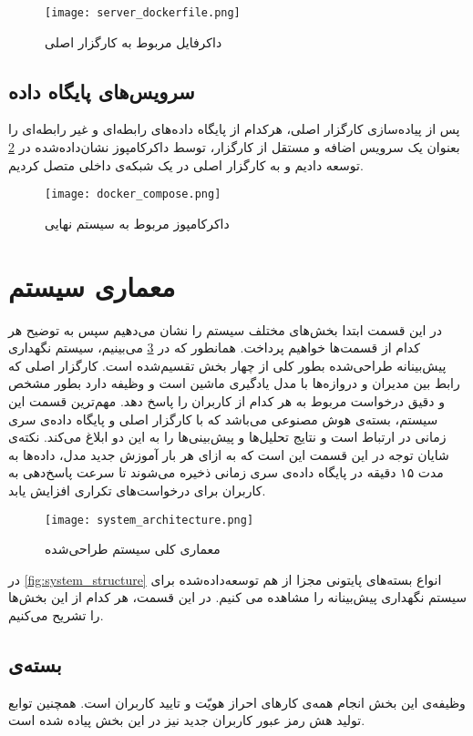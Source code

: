 \begin{figure}[!h]
\centerline{\texttt{[image: server\_dockerfile.png]}}
\caption{داکرفایل مربوط به کارگزار اصلی}
\label{fig:server_dockerfile}
\end{figure}

\subsection{سرویس‌های پایگاه داده}
پس از پیاده‌سازی کارگزار اصلی، هرکدام از پایگاه‌ داده‌های رابطه‌ای و غیر رابطه‌ای را بعنوان یک سرویس اضافه و مستقل از کارگزار، توسط داکرکامپوز نشان‌داده‌‌شده در \cref{fig:docker_compose} توسعه دادیم و به کارگزار اصلی در یک شبکه‌ی داخلی متصل کردیم.

\begin{figure}[!h]
\centerline{\texttt{[image: docker\_compose.png]}}
\caption{داکرکامپوز مربوط به سیستم نهایی}
\label{fig:docker_compose}
\end{figure}


\section{معماری سیستم}
در این قسمت ابتدا بخش‌های مختلف سیستم را نشان می‌دهیم سپس به توضیح هر کدام از قسمت‌ها خواهیم پرداخت. همانطور که در \cref{fig:system_architecture} می‌بینیم، سیستم نگهداری پیش‌بینانه طراحی‌شده بطور کلی از چهار بخش تقسیم‌شده است. کارگزار اصلی که رابط بین مدیران و دروازه‌ها با مدل یادگیری ماشین است و وظیفه‌ دارد بطور مشخص و دقیق درخواست مربوط به هر کدام از کاربران را پاسخ دهد. مهم‌ترین قسمت این سیستم، بسته‌ی هوش مصنوعی می‌باشد که با کارگزار اصلی و پایگاه‌ داده‌ی سری زمانی در ارتباط است و نتایج تحلیل‌ها و پیش‌بینی‌ها را به این دو ابلاغ می‌کند. نکته‌ی شایان توجه در این قسمت این است که به ازای هر بار آموزش جدید مدل، داده‌ها به مدت ۱۵ دقیقه در پایگاه‌ داده‌ی سری زمانی ذخیره می‌شوند تا سرعت پاسخ‌دهی به کاربران برای درخواست‌های تکراری افزایش یابد.

\begin{figure}[!h]
\centerline{\texttt{[image: system\_architecture.png]}}
\caption{معماری کلی سیستم طراحی‌شده}
\label{fig:system_architecture}
\end{figure}


در \cref{fig:system_structure} انواع بسته‌های پایتونی مجزا از هم توسعه‌داده‌شده برای سیستم نگهداری پیش‌بینانه را مشاهده می کنیم. در این قسمت، هر کدام از این بخش‌ها را تشریح می‌کنیم.

\subsection{بسته‌ی }
وظیفه‌ی این بخش انجام همه‌ی کارهای احراز هویّت و تایید کاربران است. همچنین توابع تولید هش رمز عبور کاربران جدید نیز در این بخش پیاد‌ه ‌شده است.


